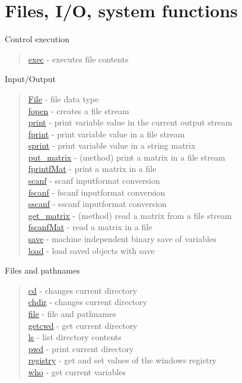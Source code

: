 \chapter*{Files, I/O, system functions}

Control execution
\begin{quote}
\noindent
\hyperlink{exec}{exec} - {executes file contents} \\ %
\end{quote}


Input/Output
\begin{quote}
\noindent
\hyperlink{File}{File} - file data type  \\
\hyperlink{fopen}{fopen} - creates a file stream \\
\hyperlink{print}{print} - print variable value in the current output stream\\
\hyperlink{fprint}{fprint} - print variable value in a file stream\\
\hyperlink{sprint}{sprint} - print variable value in a string matrix \\
\hyperlink{put_matrix}{put\_matrix} - (method) print a matrix in a file stream\\
\hyperlink{fprintfMat}{fprintfMat} - print a matrix in a file\\
\hyperlink{scanf}{scanf} - scanf input{\mansrc format conversion \\}
\hyperlink{fscanf}{fscanf} - fscanf input{\mansrc format conversion \\}
\hyperlink{sscanf}{sscanf} - sscanf input{\mansrc format conversion \\}
\hyperlink{get_matrix}{get\_matrix} - (method) read a matrix from a file stream\\
\hyperlink{fscanfMat}{fscanfMat} - read a matrix in a file\\
\hyperlink{save}{save} - machine independent binary save of variables\\
\hyperlink{load}{load} - load saved objects with save\\
\end{quote}

Files and pathnames
\begin{quote}
\noindent
\hyperlink{cd}{cd} - {changes current directory} \\ %
\hyperlink{chdir}{chdir} - {changes current directory} \\ %
\hyperlink{file}{file} - file and pathnames\\
\hyperlink{getcwd}{getcwd} - {get current directory} \\
\hyperlink{ls}{ls} - {list directory contents} \\ %
\hyperlink{pwd}{pwd} - {print current directory} \\ %
\hyperlink{registry}{registry} - get and set values of the windows registry\\
\hyperlink{who}{who} - get current variables\\
\end{quote}

